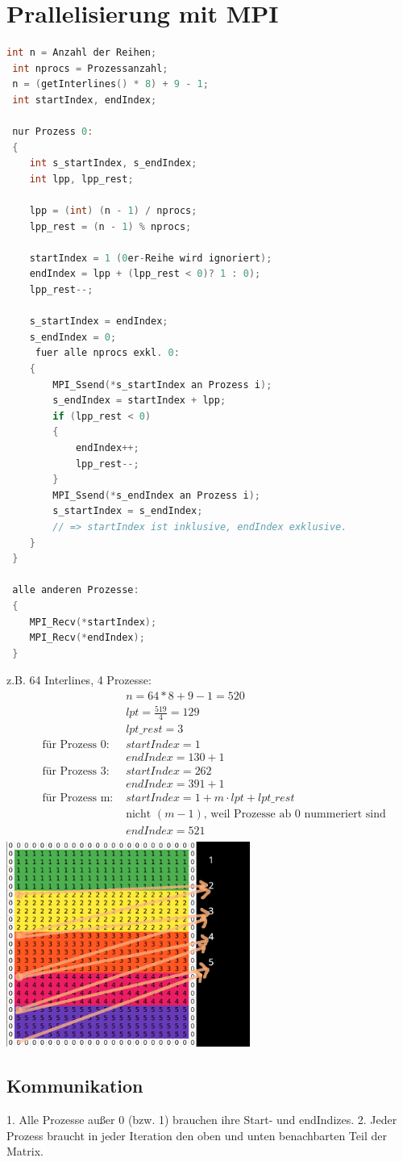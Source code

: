 \documentclass[a4paper,10pt]{article}
\begin{document}
\section{Prallelisierung mit MPI}

\begin{lstlisting}[language=C]
 int n = Anzahl der Reihen;
 int nprocs = Prozessanzahl;
 n = (getInterlines() * 8) + 9 - 1;
 int startIndex, endIndex;

 nur Prozess 0:
 {
    int s_startIndex, s_endIndex;
    int lpp, lpp_rest;

    lpp = (int) (n - 1) / nprocs;
    lpp_rest = (n - 1) % nprocs;

    startIndex = 1 (0er-Reihe wird ignoriert);
    endIndex = lpp + (lpp_rest < 0)? 1 : 0);
    lpp_rest--;

    s_startIndex = endIndex;
    s_endIndex = 0;
     fuer alle nprocs exkl. 0:
    {
        MPI_Ssend(*s_startIndex an Prozess i);
        s_endIndex = startIndex + lpp;
        if (lpp_rest < 0)
        {
            endIndex++;
            lpp_rest--;
        }
        MPI_Ssend(*s_endIndex an Prozess i);
        s_startIndex = s_endIndex;
        // => startIndex ist inklusive, endIndex exklusive.
    }
 }

 alle anderen Prozesse:
 {
    MPI_Recv(*startIndex);
    MPI_Recv(*endIndex);
 }

\end{lstlisting}

z.B. 64 Interlines, 4 Prozesse:
\begin{align*}
  & &n = 64 * 8 + 9 - 1 = 520\\
  & &lpt = \frac{519}{4} = 129 \\
  & &lpt\_rest = 3 \\
 &\text{für Prozess 0: }
 &startIndex = 1 \\
 & &endIndex = 130 + 1\\
 &\text{für Prozess 3: }
 &startIndex = 262\\
 & &endIndex = 391 + 1\\
 &\text{für Prozess m:  }
 &startIndex = 1 + m \cdot lpt + lpt\_rest \\
  & &\text{nicht $(m - 1)$, weil Prozesse ab 0 nummeriert sind}\\
 & &endIndex = 521\\
\end{align*}
\includegraphics[width=8cm]{Untitled.png}
\subsection*{Kommunikation}
1. Alle Prozesse außer 0 (bzw. 1) brauchen ihre Start- und endIndizes.
2. Jeder Prozess braucht in jeder Iteration den oben und unten benachbarten Teil der Matrix.
\end{document}
